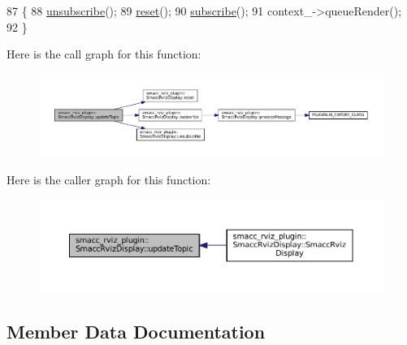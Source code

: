 \begin{DoxyCode}
87   \{
88     \hyperlink{classsmacc__rviz__plugin_1_1SmaccRvizDisplay_a49a35acd10a664a8335ef5852f8c115c}{unsubscribe}();
89     \hyperlink{classsmacc__rviz__plugin_1_1SmaccRvizDisplay_af9cf4f5ef4f5fdb2fcb1bf1a81cdac4d}{reset}();
90     \hyperlink{classsmacc__rviz__plugin_1_1SmaccRvizDisplay_ad774027ba3eda277c991619332495cbb}{subscribe}();
91     context\_->queueRender();
92   \}
\end{DoxyCode}
Here is the call graph for this function\+:
\nopagebreak
\begin{figure}[H]
\begin{center}
\leavevmode
\includegraphics[width=350pt]{classsmacc__rviz__plugin_1_1SmaccRvizDisplay_adf332ae95bd83969b33ba713a60832fd_cgraph}
\end{center}
\end{figure}
Here is the caller graph for this function\+:
\nopagebreak
\begin{figure}[H]
\begin{center}
\leavevmode
\includegraphics[width=350pt]{classsmacc__rviz__plugin_1_1SmaccRvizDisplay_adf332ae95bd83969b33ba713a60832fd_icgraph}
\end{center}
\end{figure}


\subsection{Member Data Documentation}
\mbox{\label{classsmacc__rviz__plugin_1_1SmaccRvizDisplay_a342ff238c1dfaa427f09ee205a9e92d5}} 
